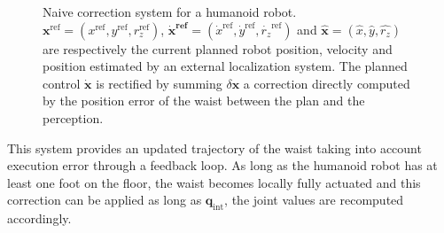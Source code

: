 \begin{figure}[ht!]
  \begin{center}
  \end{center}
  \caption{Naive correction system for a humanoid
    robot. $\mathbf{x}^{\text{ref}} = (x^{\text{ref}}, y^{\text{ref}},
    r_z^{\text{ref}})$, $\mathbf{\dot{x}^{\text{ref}}} =
    (\dot{x}^{\text{ref}}, \dot{y}^{\text{ref}},
    \dot{r_z}^{\text{ref}})$ and $\mathbf{\hat{x}} = (\hat{x},
    \hat{y}, \hat{r_z})$ are respectively the current planned robot
    position, velocity and position estimated by an external
    localization system. The planned control $\mathbf{\dot{x}}$ is
    rectified by summing $\delta \mathbf{x}$ a correction directly
    computed by the position error of the waist between the plan and
    the perception. \label{fig:system}}
\end{figure}


This system provides an updated trajectory of the waist taking into
account execution error through a feedback loop. As long as the
humanoid robot has at least one foot on the floor, the waist becomes
locally fully actuated and this correction can be applied as long as
$\mathbf{q}_{\text{int}}$, the joint values are recomputed
accordingly.


